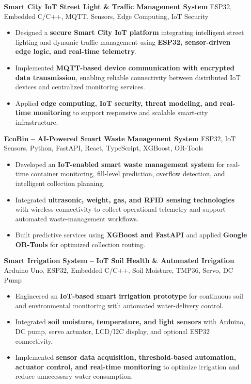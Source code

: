 \documentclass[a4paper,11pt]{article}
\newcommand{\resumeItem}[1]{
    \item \small{#1 \vspace{-2pt}}
}
\newcommand{\resumeProject}[2]{
    \vspace{2pt}
    \textbf{#1} \hfill {\small #2}
    \vspace{2pt}
}
\begin{document}
\resumeProject
{Smart City IoT Street Light \& Traffic Management System}
{ESP32, Embedded C/C++, MQTT, Sensors, Edge Computing, IoT Security}

\begin{itemize}[leftmargin=*]

\resumeItem{Designed a \textbf{secure Smart City IoT platform} integrating intelligent street lighting and dynamic traffic management using \textbf{ESP32, sensor-driven edge logic, and real-time telemetry}.}

\resumeItem{Implemented \textbf{MQTT-based device communication with encrypted data transmission}, enabling reliable connectivity between distributed IoT devices and centralized monitoring services.}

\resumeItem{Applied \textbf{edge computing, IoT security, threat modeling, and real-time monitoring} to support responsive and scalable smart-city infrastructure.}

\end{itemize}

\vspace{1mm}

\resumeProject
{EcoBin -- AI-Powered Smart Waste Management System}
{ESP32, IoT Sensors, Python, FastAPI, React, TypeScript, XGBoost, OR-Tools}

\begin{itemize}[leftmargin=*]

\resumeItem{Developed an \textbf{IoT-enabled smart waste management system} for real-time container monitoring, fill-level prediction, overflow detection, and intelligent collection planning.}

\resumeItem{Integrated \textbf{ultrasonic, weight, gas, and RFID sensing technologies} with wireless connectivity to collect operational telemetry and support automated waste-management workflows.}

\resumeItem{Built predictive services using \textbf{XGBoost and FastAPI} and applied \textbf{Google OR-Tools} for optimized collection routing.}

\end{itemize}

\vspace{1mm}

\resumeProject
{Smart Irrigation System -- IoT Soil Health \& Automated Irrigation}
{Arduino Uno, ESP32, Embedded C/C++, Soil Moisture, TMP36, Servo, DC Pump}

\begin{itemize}[leftmargin=*]

\resumeItem{Engineered an \textbf{IoT-based smart irrigation prototype} for continuous soil and environmental monitoring with automated water-delivery control.}

\resumeItem{Integrated \textbf{soil moisture, temperature, and light sensors} with Arduino, DC pump, servo actuator, LCD/I2C display, and optional ESP32 connectivity.}

\resumeItem{Implemented \textbf{sensor data acquisition, threshold-based automation, actuator control, and real-time monitoring} to optimize irrigation and reduce unnecessary water consumption.}

\end{itemize}
\end{document}
